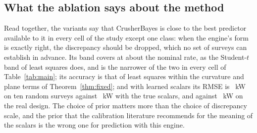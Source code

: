 \subsection{What the ablation says about the method}

Read together, the variants say that CrusherBayes is close to the best predictor available to it in every cell of the study
except one class: when the engine's form is exactly right, the discrepancy should be dropped, which no set of surveys can
establish in advance. Its band covers at about the nominal rate, as the Student-$t$ band of least squares does, and is the
narrower of the two in every cell of Table~\ref{tab:main}; its accuracy is that of least squares within the curvature and plane
terms of Theorem~\ref{thm:fixed}; and with learned scalars its RMSE is \rVzeroSTenKwKo~kW on ten random surveys against
\rVzeroSTenKwOr~kW with the true scalars, and \rVzeroRealKwKo{} against \rVzeroRealKwOr~kW on the real design. The choice of prior matters more than the choice of discrepancy scale, and the prior that the calibration literature
recommends for the meaning of the scalars is the wrong one for prediction with this engine.
